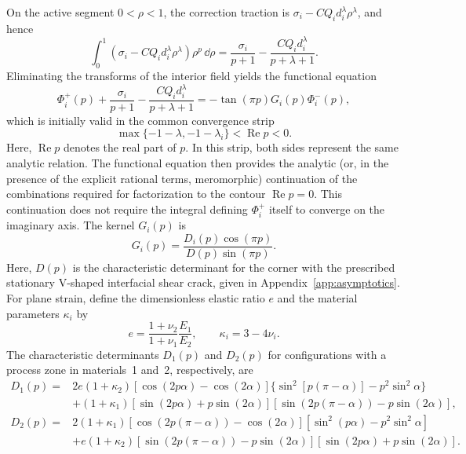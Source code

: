 On the active segment $0<\rho<1$, the correction traction is
$\sigma_i-CQ_i d_i^\lambda\rho^\lambda$, and hence
\begin{equation*}
  \int_0^1
  \left(\sigma_i-CQ_i d_i^\lambda\rho^\lambda\right)
  \rho^p\,\dd\rho
  =
  \frac{\sigma_i}{p+1}
  -\frac{CQ_i d_i^\lambda}{p+\lambda+1}.
\end{equation*}
Eliminating the transforms of the interior field yields the functional
equation
\begin{equation}
\label{eq:wiener-hopf-functional}
  \Phi_i^+(p)
  +\frac{\sigma_i}{p+1}
  -\frac{CQ_i d_i^\lambda}{p+\lambda+1}
  =-\tan(\pi p)G_i(p)\Phi_i^-(p),
\end{equation}
which is initially valid in the common convergence strip
\begin{equation*}
  \max\{-1-\lambda,-1-\lambda_i\}
  <\operatorname{Re}p<0.
\end{equation*}
Here, $\operatorname{Re}p$ denotes the real part of $p$. In this strip,
both sides represent the same analytic relation. The functional equation then provides the analytic (or, in the presence of
the explicit rational terms, meromorphic) continuation of the combinations
required for factorization to the contour $\operatorname{Re}p=0$. This
continuation does not require the integral defining $\Phi_i^+$ itself to
converge on the imaginary axis. The
kernel $G_i(p)$ is
\begin{equation*}
  G_i(p)=\frac{D_i(p)\cos(\pi p)}{D(p)\sin(\pi p)}.
\end{equation*}
Here, $D(p)$ is the characteristic determinant for the corner with the
prescribed stationary V-shaped interfacial shear crack, given in
Appendix~\ref{app:asymptotics}.
For plane strain, define the dimensionless elastic ratio $e$ and the
material parameters $\kappa_i$ by
\begin{equation*}
  e=\frac{1+\nu_2}{1+\nu_1}\frac{E_1}{E_2},
  \qquad
  \kappa_i=3-4\nu_i.
\end{equation*}
The characteristic determinants $D_1(p)$ and $D_2(p)$ for configurations
with a process zone in materials~1 and~2, respectively, are
\begin{equation*}
\begin{aligned}
  D_1(p)={}&2e(1+\kappa_2)
    [\cos(2p\alpha)-\cos(2\alpha)]
    \{\sin^2[p(\pi-\alpha)]-p^2\sin^2\alpha\}\\
  &+(1+\kappa_1)
    [\sin(2p\alpha)+p\sin(2\alpha)]
    [\sin(2p(\pi-\alpha))-p\sin(2\alpha)],\\[2pt]
  D_2(p)={}&2(1+\kappa_1)
    [\cos(2p(\pi-\alpha))-\cos(2\alpha)]
    [\sin^2(p\alpha)-p^2\sin^2\alpha]\\
  &+e(1+\kappa_2)
    [\sin(2p(\pi-\alpha))-p\sin(2\alpha)]
    [\sin(2p\alpha)+p\sin(2\alpha)].
\end{aligned}
\end{equation*}
